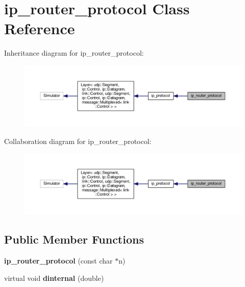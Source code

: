 \hypertarget{classip__router__protocol}{}\section{ip\+\_\+router\+\_\+protocol Class Reference}
\label{classip__router__protocol}


Inheritance diagram for ip\+\_\+router\+\_\+protocol\+:\nopagebreak
\begin{figure}[H]
\begin{center}
\leavevmode
\includegraphics[width=350pt]{classip__router__protocol__inherit__graph}
\end{center}
\end{figure}


Collaboration diagram for ip\+\_\+router\+\_\+protocol\+:\nopagebreak
\begin{figure}[H]
\begin{center}
\leavevmode
\includegraphics[width=350pt]{classip__router__protocol__coll__graph}
\end{center}
\end{figure}
\subsection*{Public Member Functions}
\begin{DoxyCompactItemize}
\item 
{\bfseries ip\+\_\+router\+\_\+protocol} (const char $\ast$n)\hypertarget{classip__router__protocol_ada17ebcf7f7b834d9c62133815d4669d}{}\label{classip__router__protocol_ada17ebcf7f7b834d9c62133815d4669d}

\item 
virtual void {\bfseries dinternal} (double)\hypertarget{classip__router__protocol_a14cf3c7e1418ee8c6035b79626f99438}{}\label{classip__router__protocol_a14cf3c7e1418ee8c6035b79626f99438}

\end{DoxyCompactItemize}
